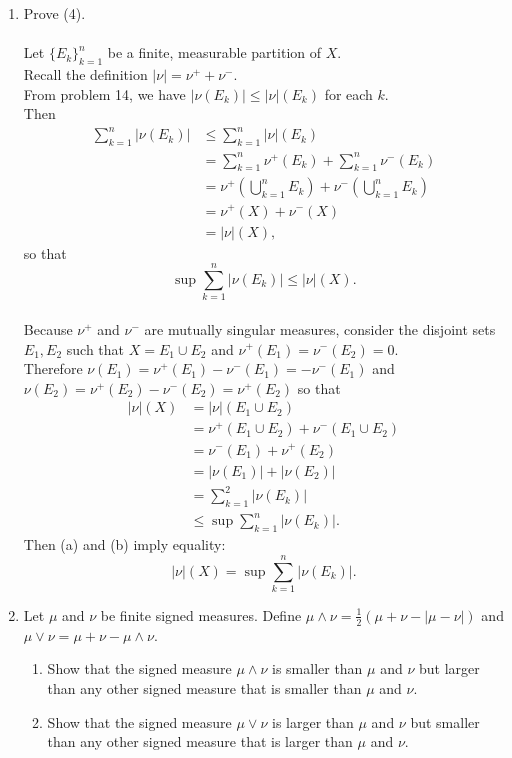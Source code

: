 \begin{enumerate}
	\item Prove (4).\\
	\\Let $\{E_k\}_{k=1}^n$ be a finite, measurable partition of $X$.
	\\Recall the definition $|\nu|=\nu^++\nu^-$.
	\\From problem 14, we have $|\nu(E_k)|\le|\nu|(E_k)$ for each $k$.
	\\Then 
	\begin{align*}
		\sum_{k=1}^n|\nu(E_k)|
		&\le\sum_{k=1}^n|\nu|(E_k)\\
		&=\sum_{k=1}^n\nu^+(E_k)+\sum_{k=1}^n\nu^-(E_k)\\
		&=\nu^+(\bigcup_{k=1}^n E_k)+\nu^-(\bigcup_{k=1}^n E_k)\\
		&=\nu^+(X)+\nu^-(X)\\
		&=|\nu|(X),
	\end{align*}
	so that
	\[
		\sup\sum_{k=1}^n|\nu(E_k)|\le|\nu|(X).\tag{a}
	\]
	\\Because $\nu^+$ and $\nu^-$ are mutually singular measures, consider the disjoint sets $E_1,E_2$ such that $X=E_1\cup E_2$ and $\nu^+(E_1)=\nu^-(E_2)=0$.
	\\Therefore $\nu(E_1)=\nu^+(E_1)-\nu^-(E_1)=-\nu^-(E_1)$ and $\nu(E_2)=\nu^+(E_2)-\nu^-(E_2)=\nu^+(E_2)$ so that 
	\begin{align*}
		|\nu|(X)&=|\nu|(E_1\cup E_2)\\
		&=\nu^+(E_1\cup E_2)+\nu^-(E_1\cup E_2)\\
		&=\nu^-(E_1)+\nu^+(E_2)\\
		&=|\nu(E_1)|+|\nu(E_2)|\\
		&=\sum_{k=1}^2|\nu(E_k)|\\
		&\le\sup\sum_{k=1}^n|\nu(E_k)|.\tag{b}
	\end{align*}
	Then (a) and (b) imply equality:
	\[
		|\nu|(X)=\sup\sum_{k=1}^n|\nu(E_k)|.
	\]
	\item Let $\mu$ and $\nu$ be finite signed measures.
	Define $\mu\land\nu=\frac{1}{2}(\mu+\nu-|\mu-\nu|)$ and $\mu\lor\nu=\mu+\nu-\mu\land\nu$.
	\begin{enumerate}[label=(\roman*),align=left]  
		\item Show that the signed measure $\mu\land\nu$ is smaller than $\mu$ and $\nu$ but larger than any other signed measure that is smaller than $\mu$ and $\nu$.
		\item Show that the signed measure $\mu\lor\nu$ is larger than $\mu$ and $\nu$ but smaller than any other signed measure that is larger than $\mu$ and $\nu$.

\end{enumerate}
\end{enumerate}
